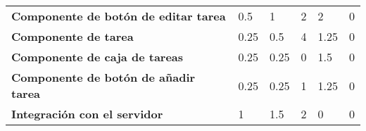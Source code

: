 \begin{table}[]
\begin{adjustbox}{width=\columnwidth,center}
\begin{tabular}{llllll}
{\color[HTML]{000000} \textbf{Componente de botón de editar tarea}}    & {\color[HTML]{000000} 0.5}                      & {\color[HTML]{000000} 1}                        & {\color[HTML]{000000} 2}                            & {\color[HTML]{000000} 2}                                    & {\color[HTML]{000000} 0}                                        \\
{\color[HTML]{000000} \textbf{Componente de tarea}}                    & {\color[HTML]{000000} 0.25}                     & {\color[HTML]{000000} 0.5}                      & {\color[HTML]{000000} 4}                            & {\color[HTML]{000000} 1.25}                                 & {\color[HTML]{000000} 0}                                        \\
{\color[HTML]{000000} \textbf{Componente de caja de tareas}}           & {\color[HTML]{000000} 0.25}                     & {\color[HTML]{000000} 0.25}                     & {\color[HTML]{000000} 0}                            & {\color[HTML]{000000} 1.5}                                  & {\color[HTML]{000000} 0}                                        \\
{\color[HTML]{000000} \textbf{Componente de botón de añadir tarea}}    & {\color[HTML]{000000} 0.25}                     & {\color[HTML]{000000} 0.25}                     & {\color[HTML]{000000} 1}                            & {\color[HTML]{000000} 1.25}                                 & {\color[HTML]{000000} 0}                                        \\
{\color[HTML]{000000} \textbf{Integración con el servidor}}            & {\color[HTML]{000000} 1}                        & {\color[HTML]{000000} 1.5}                      & {\color[HTML]{000000} 2}                            & {\color[HTML]{000000} 0}                                    & {\color[HTML]{000000} 0}
\end{tabular}
\end{adjustbox}
\end{table}
